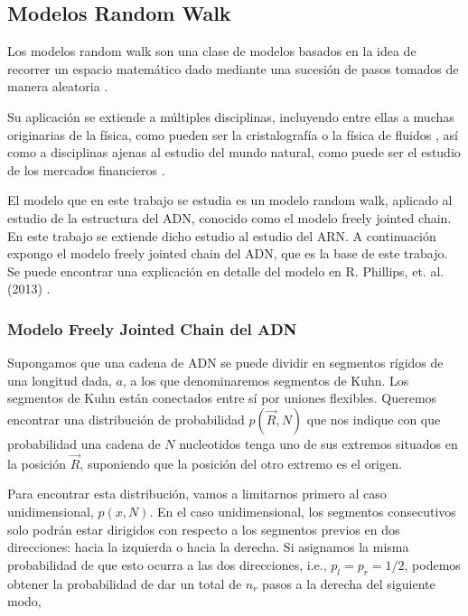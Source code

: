 \documentclass[a4paper,11pt,titlepage]{article}
\theoremstyle{definition}
\begin{document}
\subsection{Modelos Random Walk}\label{subsec:rndwalk}

Los modelos random walk son una clase de modelos basados en la idea de recorrer un espacio matemático dado mediante una sucesión de pasos tomados de manera aleatoria \cite{doyle} \cite{pearson}.

Su aplicación se extiende a múltiples disciplinas, incluyendo entre ellas a muchas originarias de la física, como pueden ser la cristalografía o la física de fluidos \cite{weiss}, así como a disciplinas ajenas al estudio del mundo natural, como puede ser el estudio de los mercados financieros \cite{blsch}.

El modelo que en este trabajo se estudia es un modelo random walk, aplicado al estudio de la estructura del ADN, conocido como el modelo freely jointed chain. En este trabajo se extiende dicho estudio al estudio del ARN. A continuación expongo el modelo freely jointed chain del ADN, que es la base de este trabajo. Se puede encontrar una explicación en detalle del modelo en R. Phillips, et. al. (2013) \cite{phillips}.

\subsubsection{Modelo Freely Jointed Chain del ADN}\label{subsubsec:rndpoly} %

Supongamos que una cadena de ADN se puede dividir en segmentos rígidos de una longitud dada, $a$, a los que denominaremos segmentos de Kuhn. Los segmentos de Kuhn están conectados entre sí por uniones flexibles. Queremos encontrar una distribución de probabilidad $p(\vec{R}, N)$ que nos indique con que probabilidad una cadena de $N$ nucleotidos tenga uno de sus extremos situados en la posición $\vec{R}$, suponiendo que la posición del otro extremo es el origen.

Para encontrar esta distribución, vamos a limitarnos primero al caso unidimensional, $p(x, N)$. En el caso unidimensional, los segmentos consecutivos solo podrán estar dirigidos con respecto a los segmentos previos en dos direcciones: hacia la izquierda o hacia la derecha. Si asignamos la misma probabilidad de que esto ocurra a las dos direcciones, i.e., $p_l = p_r = 1/2$, podemos obtener la probabilidad de dar un total de $n_r$ pasos a la derecha del siguiente modo,
\end{document}
